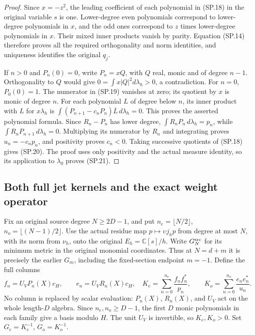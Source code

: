 \begin{proof}
Since \(x=-z^2\), the leading coefficient of each polynomial in
(SP.18) in the original variable \(s\) is one. Lower-degree even
polynomials correspond to lower-degree polynomials in \(x\), and
the odd ones correspond to \(z\) times lower-degree polynomials
in \(x\). Their mixed inner products vanish by parity. Equation
(SP.14) therefore proves all the required orthogonality and norm
identities, and uniqueness identifies the original \(q_j\).

If \(n>0\) and \(P_n(0)=0\), write \(P_n=xQ\), with \(Q\) real,
monic and of degree \(n-1\). Orthogonality to \(Q\) would give
\(0=\int x|Q|^2d\lambda_h>0\), a contradiction. For \(n=0\),
\(P_0(0)=1\). The numerator in (SP.19) vanishes at zero; its quotient
by \(x\) is monic of degree \(n\). For each polynomial \(L\) of
degree below \(n\), its inner product with \(L\) for \(x\lambda_h\)
is \(\int(P_{n+1}-c_nP_n)\overline L\,d\lambda_h=0\). This proves
the asserted polynomial formula. Since \(R_n-P_n\) has lower degree,
\(\int R_nP_n\,d\lambda_h=p_n\), while
\(\int R_nP_{n+1}\,d\lambda_h=0\). Multiplying its numerator by
\(R_n\) and integrating proves \(u_n=-c_np_n\), and positivity
proves \(c_n<0\). Taking successive quotients of (SP.18) gives
(SP.20). The proof uses only positivity and the actual measure
identity, so its application to \(\lambda_0\) proves (SP.21).
\end{proof}

\subsection{Both full jet kernels and the exact weight operator}

Fix an original source degree \(N\ge2D-1\), and put
\(n_e=\lfloor N/2\rfloor\), \(n_o=\lfloor(N-1)/2\rfloor\).
Use the actual residue map \(p\mapsto\upsilon j_hp\) from degree
at most \(N\), with its norm from \(\nu_h\), onto the original
\(E_h=\mathbb C[s]/h\). Write \(G_N^{\rm src}\) for its minimum
metric in the original monomial coordinates. Thus at
\(N=d+m\) it is precisely the earlier \(G_m\), including the
fixed-section endpoint \(m=-1\). Define the full columns
\[
 f_n=U_VP_n(X)c_H,\qquad e_n=U_VR_n(X)c_H,
 \quad
 K_e=\sum_{n=0}^{n_e}\frac{f_nf_n^*}{p_n},\qquad
 K_o=\sum_{n=0}^{n_o}\frac{e_ne_n^*}{u_n}.
 \tag{SP.22}
\]
No column is replaced by scalar evaluation: \(P_n(X)\),
\(R_n(X)\), and \(U_V\) act on the whole length-\(D\) algebra.
Since \(n_e,n_o\ge D-1\), the first \(D\) monic polynomials in
each family give a basis modulo \(H\). The unit \(U_V\) is
invertible, so \(K_e,K_o>0\). Set \(G_e=K_e^{-1}\), \(G_o=K_o^{-1}\).


